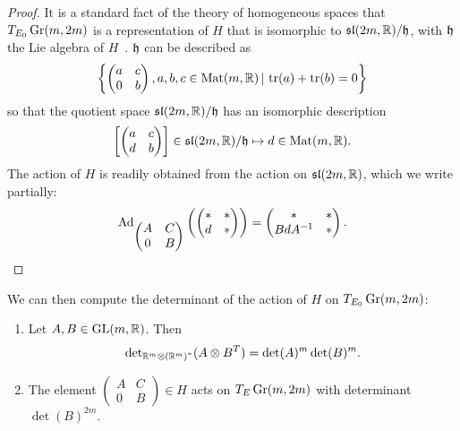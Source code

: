 \documentclass[english]{article}
\begin{document}
\begin{proof}
	It is a standard fact of the theory of homogeneous spaces that $T_{E_0} \operatorname{Gr}(m,2m)$ is a representation of $H$ that is isomorphic to $\mathfrak{sl}(2m, \mathbb{R})/\mathfrak h$, with $\mathfrak h$ the Lie algebra of $H$~\cite{MichorTopicsDG}.
	$\mathfrak h$ can be described as
	\[
		\left\{
			\begin{pmatrix}
				a & c \\
				0 & b
			\end{pmatrix}
			, a, b, c \in \operatorname{Mat}(m, \mathbb{R})
			\, | \,
			\operatorname{tr}(a) + \operatorname{tr}(b) = 0		
		\right\}
	\]
	so that the quotient space $\mathfrak{sl}(2m, \mathbb{R})/\mathfrak h$ has an isomorphic description
	\[
		\left[
			\begin{pmatrix}
				a & c \\
				d & b
			\end{pmatrix}
		\right]	
		\in \mathfrak{sl}(2m, \mathbb{R})/\mathfrak h
		\mapsto 
		d \in \operatorname{Mat}(m, \mathbb{R})
	.\]
	The action of $H$ is readily obtained from the action on $\mathfrak{sl}(2m, \mathbb{R})$, which we write partially:
\begin{equation*}
	\operatorname{Ad}_{\begin{pmatrix}
				A & C\\
				0 & B
			\end{pmatrix}}
	\left(
		\begin{pmatrix}
				* & *\\
				d & *
			\end{pmatrix}
	\right)
	=
		\begin{pmatrix}
				* & *\\
				BdA^{-1} & *
			\end{pmatrix}
.\end{equation*}
\end{proof}
%
We can then compute the determinant of the action of $H$ on $T_{E_0} \operatorname{Gr}(m,2m)$:
\begin{lemma}\label{lmno:detTEGrass}
\begin{enumerate}
	\item Let $A, B \in \operatorname{GL}(m, \mathbb{R})$. Then 
	\[
		\det\nolimits_{\mathbb{R}^m \otimes \left(\mathbb{R}^m \right)^*} (A\otimes B^T)
		= \det(A)^m \det(B)^m
	.\]
%
	\item The element
		$\begin{pmatrix}
			A & C\\
			0 & B
		\end{pmatrix} \in H$
		acts on $T_E \operatorname{Gr}(m,2m)$ with determinant $\det(B)^{2m}$.
\end{enumerate}
\end{lemma}
\end{document}

